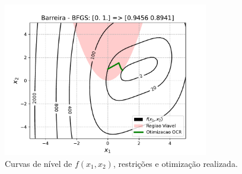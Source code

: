 \documentclass[10pt, a4paper]{article}
\begin{document}
\begin{figure}[H]
  \centering
    \includegraphics[width=0.8\textwidth]{fig_p1/Barreira_f.pdf}
  \caption{Curvas de nível de $f(x_1,x_2)$, restrições e otimização realizada. }
\end{figure}
\end{document}
